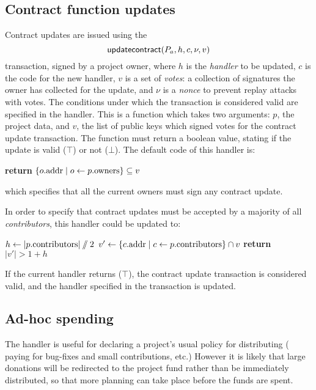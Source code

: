 \subsection{Contract function updates}

Contract updates are issued using the
\[
    \mathsf{updatecontract}\lparen P_a, h, c, \nu, v\rparen
\]
transaction, signed by a project owner, where $h$ is the \emph{handler} to be
updated, $c$ is the code for the new handler, $v$ is a set of \emph{votes}: a
collection of signatures the owner has collected for the update, and $\nu$ is a
\emph{nonce} to prevent replay attacks with votes. The conditions under which
the transaction is considered valid are specified in the
 handler. This is a function which takes two
arguments: $p$, the project data, and $v$, the list of public keys which signed
votes for the contract update transaction. The function must return a boolean
value, stating if the update is valid ($\top$) or not ($\bot$).  The default
code of this handler is:
\begin{algorithmic}[0]
        \State \textbf{return} $\{ o.{\mathrm{addr}} \mid o \gets p.{\mathrm{owners}} \} \subseteq v$
    \EndProcedure
\end{algorithmic}
which specifies that all the current owners must sign any contract update.

In order to specify that contract updates must be accepted by a majority of all
\emph{contributors}, this handler could be updated to:
\medskip
\begin{algorithmic}[0]
        \State $h \gets |p.{\mathrm{contributors}}| \sslash 2$
        \State $v' \gets \{ c.{\mathrm{addr}} \mid c \gets p.{\mathrm{contributors}} \} \cap v$
        \State \textbf{return} $|v'| > 1 + h$
    \EndProcedure
\end{algorithmic}

If the current  handler returns ($\top$), the
contract update transaction is considered valid, and the handler specified in
the transaction is updated.


\subsection{Ad-hoc spending}

The handler  is useful for declaring a project's usual policy for distributing \oscoin{}
(\eg{} paying for bug-fixes and small contributions, etc.) However it is likely
that large donations will be redirected to the project fund rather than be
immediately distributed, so that more planning can take place before the funds
are spent.

